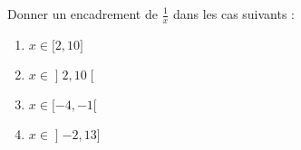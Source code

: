
\begin{exercice}\label{exosmath-0261}

    Donner un encadrement de \( \frac{1}{ x }\) dans les cas suivants :
    \begin{multicols}{3}
        \begin{enumerate}
            \item
                \( x\in\mathopen[ 2 , 10 \mathclose]\)
            \item
                \( x\in\mathopen] 2 , 10 \mathclose[\)
            \item
                \( x\in\mathopen[ -4 , -1 [\)
            \item
                \( x\in\mathopen] -2 , 13 \mathclose]\)
        \end{enumerate}
    \end{multicols}

\end{exercice}
